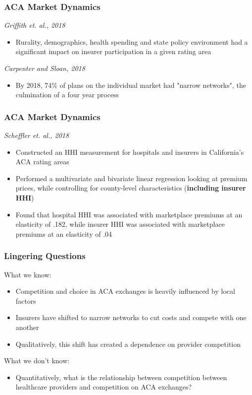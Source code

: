 \documentclass{beamer}
\begin{document}

\begin{frame}
\frametitle{ACA Market Dynamics}
\textit{Griffith et. al., 2018}
\begin{itemize}
\item Rurality, demographics, health spending and state policy environment had a significant impact on insurer participation in a given rating area
\end{itemize}
\textit{Carpenter and Sloan, 2018}
\begin{itemize}
\item By 2018, 74\% of plans on the individual market had "narrow networks", the culmination of a four year process
\end{itemize}
\end{frame}

\begin{frame}
\frametitle{ACA Market Dynamics}
\textit{Scheffler et. al., 2018}
\begin{itemize}
\item Constructed an HHI measurement for hospitals and insurers in California's ACA rating areas
\item Performed a multivariate and bivariate linear regression looking at premium prices, while controlling for county-level characteristics (\textbf{including insurer HHI})
\item Found that hospital HHI was associated with marketplace premiums at an elasticity of .182, while insurer HHI was associated with marketplace premiums at an elasticity of .04
\end{itemize}
\end{frame}

\begin{frame}
\frametitle{Lingering Questions}
What we know:
\begin{itemize}
\item Competition and choice in ACA exchanges is heavily influenced by local factors
\item Insurers have shifted to narrow networks to cut costs and compete with one another
\item Qualitatively, this shift has created a dependence on provider competition
\end{itemize}
What we don't know:
\begin{itemize}
\item Quantitatively, what is the relationship between competition between healthcare providers and competition on ACA exchanges?
\end{itemize}
\end{frame}
\end{document}
